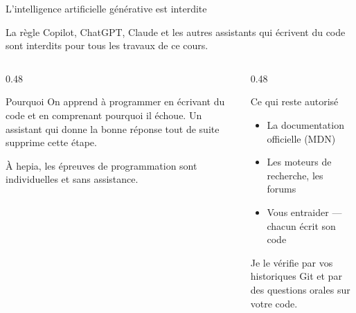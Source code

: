 \documentclass[aspectratio=169,11pt]{beamer}
\begin{document}
\begin{frame}{L'intelligence artificielle générative est interdite}
  \vspace{0.2cm}
  \begin{alertblock}{La règle}
    Copilot, ChatGPT, Claude et les autres assistants qui écrivent du code sont interdits pour tous les travaux de ce cours.
  \end{alertblock}
  \vspace{0.35cm}
  \begin{columns}[T]
    \begin{column}{0.48\textwidth}
      \begin{block}{Pourquoi}
        \small On apprend à programmer en écrivant du code et en comprenant pourquoi il échoue. Un assistant qui donne la bonne réponse tout de suite supprime cette étape.
        \smallskip

        À hepia, les épreuves de programmation sont individuelles et sans assistance.
      \end{block}
    \end{column}
    \begin{column}{0.48\textwidth}
      \begin{block}{Ce qui reste autorisé}
        \small
        \begin{itemize}
          \item La documentation officielle (MDN)
          \item Les moteurs de recherche, les forums
          \item Vous entraider --- chacun écrit son code
        \end{itemize}
        \smallskip

        Je le vérifie par vos historiques Git et par des questions orales sur votre code.
      \end{block}
    \end{column}
  \end{columns}
\end{frame}
\end{document}
